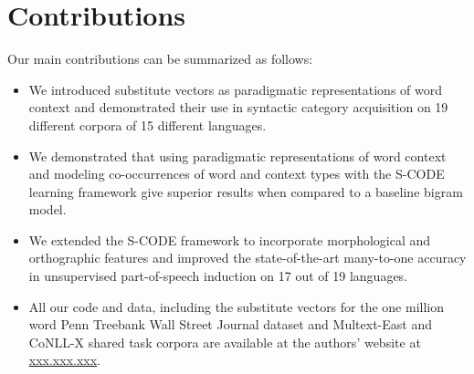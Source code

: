 \section{Contributions}
\label{sec:contrib}

Our main contributions can be summarized as follows:
\begin{itemize}
\item We introduced substitute vectors as paradigmatic representations
  of word context and demonstrated their use in syntactic category
  acquisition on 19 different corpora of 15 different languages.
\item We demonstrated that using paradigmatic representations of word
  context and modeling co-occurrences of word and context types with
  the S-CODE learning framework give superior results when compared to
  a baseline bigram model.
\item We extended the S-CODE framework to incorporate morphological
  and orthographic features and improved the state-of-the-art
  many-to-one accuracy in unsupervised part-of-speech induction on 17
  out of 19 languages.
\item All our code and data, including the substitute vectors for the
  one million word Penn Treebank Wall Street Journal dataset and
  Multext-East and CoNLL-X shared task corpora are available at the
  authors' website at \mbox{\url{xxx.xxx.xxx}}.
\end{itemize}

